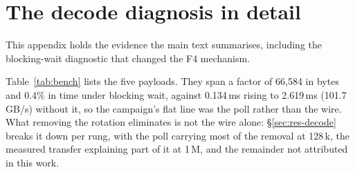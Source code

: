 \documentclass{article}
\begin{document}
\section{The decode diagnosis in detail}
\label{app:diagnosis}

This appendix holds the evidence the main text summarises, including the blocking-wait
diagnostic that changed the F4 mechanism.

\begin{table}[h]
\centering\footnotesize
\caption{Bare-process ring benchmark: the \texttt{batch\_isend\_irecv} ring primitive the
engine uses, 8 ranks, 256 rounds per payload, no model attached, both NCCL wait modes in one
session on one box. The times are rank 0's; the last two columns are the worst rank-to-rank
spread over all eight ranks in each mode, and the largest are 0.091\,ms under the blocking wait
and 0.029\,ms in the no-flag column's post-sync timings (that mode's unmatched wait-timing
spread, which the column does not show, reaches 0.110\,ms). The blocking column is the
campaign's configuration: the timing is
the host \texttt{wait()} call, which under \texttt{TORCH\_NCCL\_BLOCKING\_WAIT=1} polls with
a fixed 10\,ms sleep. The no-flag column is the same round with the wait removed, timed after a
device sync so that a transfer that has been set up but not completed is still counted.}
\label{tab:bench}

\end{table}

Table~\ref{tab:bench} lists the five payloads. They span a factor of 66{,}584 in bytes and 0.4\% in time under blocking wait,
against 0.134\,ms rising to 2.619\,ms (101.7\,GB/s) without it, so the campaign's flat line
was the poll rather than the wire. What removing the rotation eliminates is not the wire
alone: \S\ref{sec:res-decode} breaks it down per rung, with the poll carrying most of the
removal at 128\,k, the measured transfer explaining part of it at 1\,M, and the remainder
not attributed in this work.

\begin{table}[h]
\centering\footnotesize
\caption{The blocking-wait and no-flag engine arms, 128\,k and 1\,M, 16-token target-only
rows and 32-token spec rows at $T{=}0.7$, one session per mode on one box, \texttt{ring2048}
unless noted.
Every row records its wait mode in an \texttt{nccl\_env} column and its arm in
\texttt{env\_arm}.}
\label{tab:bwarms}

\end{table}
\end{document}
